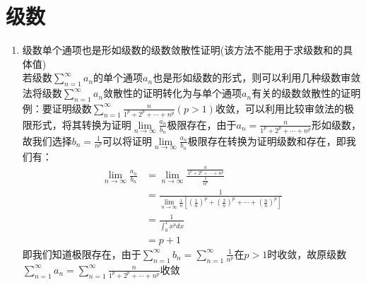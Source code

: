 \documentclass[12pt,a4paper,UTF8]{book}
\begin{document}
\section{级数}
\begin{enumerate}
\item 级数单个通项也是形如级数的级数敛散性证明(该方法不能用于求级数和的具体值)\\
若级数$\sum\limits_{n=1}^{\infty}a_n$的单个通项$a_n$也是形如级数的形式，则可以利用几种级数审敛法将级数$\sum\limits_{n=1}^{\infty}a_n$敛散性的证明转化为与单个通项$a_n$有关的级数敛散性的证明\\
例：要证明级数$\sum\limits_{n=1}^{\infty}\frac{n}{1^p+2^p+\cdots+n^p}(p>1)$收敛，可以利用比较审敛法的极限形式，将其转换为证明$\lim\limits_{n\to\infty}\frac{a_n}{b_n}$极限存在，由于$a_n=\frac{n}{1^p+2^p+\cdots+n^p}$形如级数，故我们选择$b_n=\frac{1}{n^p}$可以将证明$\lim\limits_{n\to\infty}\frac{a_n}{b_n}$极限存在转换为证明级数和存在，即我们有：
\[\begin{aligned}
\lim\limits_{n\to\infty}\frac{a_n}{b_n}&=\lim\limits_{n\to\infty}\frac{\frac{n}{1^p+2^p+\cdots+n^p}}{\frac{1}{n^p}}\\
&=\frac{1}{\lim\limits_{n\to\infty}\frac{1}{n}\left[\left(\frac{1}{n}\right)^p+\left(\frac{2}{n}\right)^p+\cdots+\left(\frac{n}{n}\right)^p\right]}\\
&=\frac{1}{\int_{0}^{1}x^pdx}\\
&=p+1
\end{aligned}\]
即我们知道极限存在，由于$\sum\limits_{n=1}^{\infty}b_n=\sum\limits_{n=1}^{\infty}\frac{1}{n^p}$在$p>1$时收敛，故原级数$\sum\limits_{n=1}^{\infty}a_n=\sum\limits_{n=1}^{\infty}\frac{n}{1^p+2^p+\cdots+n^p}$收敛
\end{enumerate}
\end{document}
